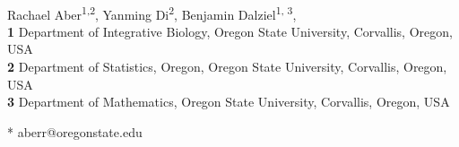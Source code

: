 \documentclass[10pt,letterpaper]{article}
\begin{document}
\vspace*{0.2in}

\begin{flushleft}
{\Large
\textbf{} %
}
\newline
\\
Rachael Aber\textsuperscript{1,2},
Yanming Di\textsuperscript{2},
Benjamin Dalziel\textsuperscript{1, 3},
\\
\bigskip
\textbf{1} Department of Integrative Biology, Oregon State University, Corvallis, Oregon, USA
\\
\textbf{2} Department of Statistics, Oregon, Oregon State University, Corvallis, Oregon, USA
\\
\textbf{3} Department of Mathematics, Oregon State University, Corvallis, Oregon, USA
\bigskip

% 
%





* aberr@oregonstate.edu

\end{flushleft}
\end{document}

